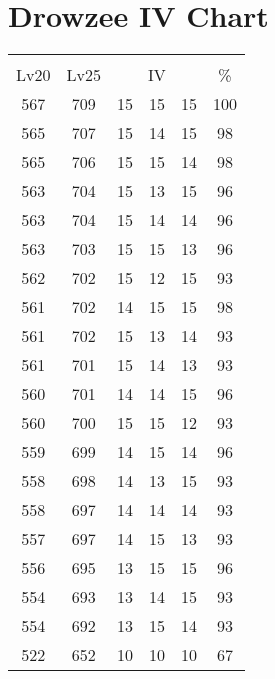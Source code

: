 \documentclass{article}%
\begin{document}
%
\normalsize%
\section{Drowzee IV Chart}%
\label{sec:Drowzee IV Chart}%
\renewcommand{\arraystretch}{1.5}%
\begin{tabular}{|c|c|c|c|c|c|}%
\hline%
\multicolumn{6}{|c|}{\textcolor{white}{ 
\linebreak{Drowzee}
}%
\cellcolor{black}}\\%
\multicolumn{1}{|c}{Lv20}&\multicolumn{1}{c|}{Lv25}&\multicolumn{3}{c|}{IV}&\multicolumn{1}{|c|}{\%}\\%
\hline%
\rowcolor{color100}%
567&709&15&15&15&100\\%
\hline%
\rowcolor{color98}%
565&707&15&14&15&98\\%
\hline%
\rowcolor{color98}%
565&706&15&15&14&98\\%
\hline%
\rowcolor{color96}%
563&704&15&13&15&96\\%
\hline%
\rowcolor{color96}%
563&704&15&14&14&96\\%
\hline%
\rowcolor{color96}%
563&703&15&15&13&96\\%
\hline%
\rowcolor{color93}%
562&702&15&12&15&93\\%
\hline%
\rowcolor{color98}%
561&702&14&15&15&98\\%
\hline%
\rowcolor{color93}%
561&702&15&13&14&93\\%
\hline%
\rowcolor{color93}%
561&701&15&14&13&93\\%
\hline%
\rowcolor{color96}%
560&701&14&14&15&96\\%
\hline%
\rowcolor{color93}%
560&700&15&15&12&93\\%
\hline%
\rowcolor{color96}%
559&699&14&15&14&96\\%
\hline%
\rowcolor{color93}%
558&698&14&13&15&93\\%
\hline%
\rowcolor{color93}%
558&697&14&14&14&93\\%
\hline%
\rowcolor{color93}%
557&697&14&15&13&93\\%
\hline%
\rowcolor{color96}%
556&695&13&15&15&96\\%
\hline%
\rowcolor{color93}%
554&693&13&14&15&93\\%
\hline%
\rowcolor{color93}%
554&692&13&15&14&93\\%
\hline%
\rowcolor{color91}%
522&652&10&10&10&67\\%
\end{tabular}

%
\end{document}
